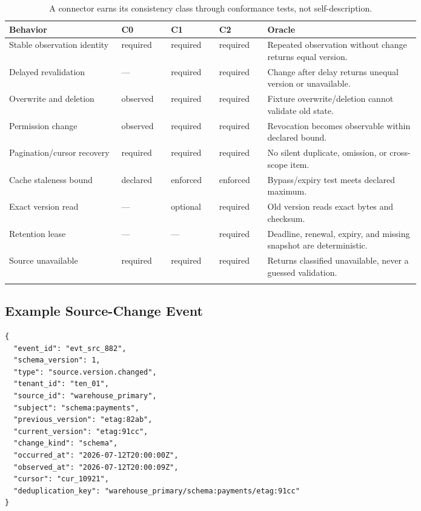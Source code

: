 \documentclass[10pt]{article}
\begin{document}
\begin{longtable}{L{0.22\linewidth}C{0.09\linewidth}C{0.09\linewidth}C{0.09\linewidth}L{0.30\linewidth}}
\toprule
\textbf{Behavior} & \textbf{C0} & \textbf{C1} & \textbf{C2} & \textbf{Oracle} \\
\midrule
\endhead
Stable observation identity & required & required & required & Repeated observation without change returns equal version. \\
Delayed revalidation & --- & required & required & Change after delay returns unequal version or unavailable. \\
Overwrite and deletion & observed & required & required & Fixture overwrite/deletion cannot validate old state. \\
Permission change & observed & required & required & Revocation becomes observable within declared bound. \\
Pagination/cursor recovery & required & required & required & No silent duplicate, omission, or cross-scope item. \\
Cache staleness bound & declared & enforced & enforced & Bypass/expiry test meets declared maximum. \\
Exact version read & --- & optional & required & Old version reads exact bytes and checksum. \\
Retention lease & --- & --- & required & Deadline, renewal, expiry, and missing snapshot are deterministic. \\
Source unavailable & required & required & required & Returns classified unavailable, never a guessed validation. \\
\bottomrule
\caption{A connector earns its consistency class through conformance tests, not self-description.}
\end{longtable}

\Needspace{0.55\textheight}
\subsection{Example Source-Change Event}

\begin{lstlisting}[style=contract]
{
  "event_id": "evt_src_882",
  "schema_version": 1,
  "type": "source.version.changed",
  "tenant_id": "ten_01",
  "source_id": "warehouse_primary",
  "subject": "schema:payments",
  "previous_version": "etag:82ab",
  "current_version": "etag:91cc",
  "change_kind": "schema",
  "occurred_at": "2026-07-12T20:00:00Z",
  "observed_at": "2026-07-12T20:00:09Z",
  "cursor": "cur_10921",
  "deduplication_key": "warehouse_primary/schema:payments/etag:91cc"
}
\end{lstlisting}
\end{document}
